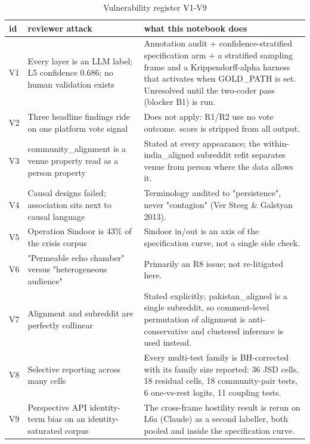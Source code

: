 \begin{table}
\caption{Vulnerability register V1-V9}
\label{tab:r1r2_vulnerability_register}
\begin{tabular}{lll}
\toprule
id & reviewer attack & what this notebook does \\
\midrule
V1 & Every layer is an LLM label; L5 confidence 0.686; no human validation exists & Annotation audit + confidence-stratified specification arm + a stratified sampling frame and a Krippendorff-alpha harness that activates when GOLD\_PATH is set. Unresolved until the two-coder pass (blocker B1) is run. \\
V2 & Three headline findings ride on one platform vote signal & Does not apply: R1/R2 use no vote outcome. score is stripped from all output. \\
V3 & community\_alignment is a venue property read as a person property & Stated at every appearance; the within-india\_aligned subreddit refit separates venue from person where the data allows it. \\
V4 & Causal designs failed; association sits next to causal language & Terminology audited to "persistence", never "contagion" (Ver Steeg \& Galstyan 2013). \\
V5 & Operation Sindoor is 43\% of the crisis corpus & Sindoor in/out is an axis of the specification curve, not a single side check. \\
V6 & "Permeable echo chamber" versus "heterogeneous audience" & Primarily an R8 issue; not re-litigated here. \\
V7 & Alignment and subreddit are perfectly collinear & Stated explicitly; pakistan\_aligned is a single subreddit, so comment-level permutation of alignment is anti-conservative and clustered inference is used instead. \\
V8 & Selective reporting across many cells & Every multi-test family is BH-corrected with its family size reported: 36 JSD cells, 18 residual cells, 18 community-pair tests, 6 one-vs-rest logits, 11 coupling tests. \\
V9 & Perspective API identity-term bias on an identity-saturated corpus & The cross-frame hostility result is rerun on L6a (Claude) as a second labeller, both pooled and inside the specification curve. \\
\bottomrule
\end{tabular}
\end{table}
